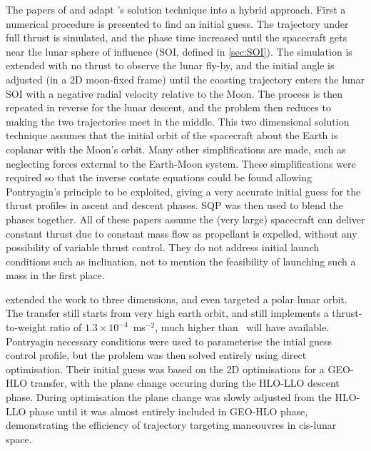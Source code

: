 The papers of \textcite{Kluever1995} and \textcite{Kluever1996} adapt \textcite{Pierson1994}'s solution technique into a hybrid approach. First a numerical procedure is presented to find an initial guess. The trajectory under full thrust is simulated, and the phase time increased until the spacecraft gets near the lunar sphere of influence (SOI, defined in \autoref{sec:SOI}). The simulation is extended with no thrust to observe the lunar fly-by, and the initial angle is adjusted (in a 2D moon-fixed frame) until the coasting trajectory enters the lunar SOI with a negative radial velocity relative to the Moon. The process is then repeated in reverse for the lunar descent, and the problem then reduces to making the two trajectories meet in the middle. This two dimensional solution technique assumes that the initial orbit of the spacecraft about the Earth is coplanar with the Moon's orbit. Many other simplifications are made, such as neglecting forces external to the Earth-Moon system. These simplifications were required so that the inverse costate equations could be found allowing Pontryagin's principle to be exploited, giving a very accurate initial guess for the thrust profiles in ascent and descent phases. SQP was then used to blend the phases together. All of these papers assume the (very large) spacecraft can deliver constant thrust due to constant mass flow as propellant is expelled, without any possibility of variable thrust control. They do not address initial launch conditions such as inclination, not to mention the feasibility of launching such a mass in the first place.

\textcite{Kluever1997} extended the work to three dimensions, and even targeted a polar lunar orbit. The transfer still starts from very high earth orbit, and still implements a thrust-to-weight ratio of $1.3\times10^{-4}$~ms$^{-2}$, much higher than \BW\ will have available. Pontryagin necessary conditions were used to parameterise the intial guess control profile, but the problem was then solved entirely using direct optimisation. Their initial guess was based on the 2D optimisations for a GEO-HLO transfer, with the plane change occuring during the HLO-LLO descent phase. During optimisation the plane change was slowly adjusted from the HLO-LLO phase until it was almost entirely included in GEO-HLO phase, demonstrating the efficiency of trajectory targeting maneouvres in cis-lunar space.





